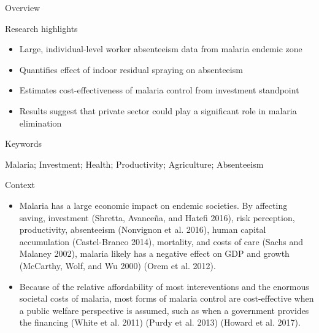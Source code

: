 \documentclass[ignorenonframetext,]{beamer}
\providecommand{\tightlist}{%
  \setlength{\itemsep}{0pt}\setlength{\parskip}{0pt}}
\begin{document}
\begin{frame}{Overview}

\begin{block}{Research highlights}

\begin{itemize}
\tightlist
\item
  Large, individual-level worker absenteeism data from malaria endemic
  zone\\
\item
  Quantifies effect of indoor residual spraying on absenteeism\\
\item
  Estimates cost-effectiveness of malaria control from investment
  standpoint\\
\item
  Results suggest that private sector could play a significant role in
  malaria elimination
\end{itemize}

\end{block}

\begin{block}{Keywords}

Malaria; Investment; Health; Productivity; Agriculture; Absenteeism

\end{block}

\end{frame}

\begin{frame}{Context}

\begin{itemize}
\tightlist
\item
  Malaria has a large economic impact on endemic societies. By affecting
  saving, investment (Shretta, Avanceña, and Hatefi 2016), risk
  perception, productivity, absenteeism (Nonvignon et al. 2016), human
  capital accumulation (Castel-Branco 2014), mortality, and costs of
  care (Sachs and Malaney 2002), malaria likely has a negative effect on
  GDP and growth (McCarthy, Wolf, and Wu 2000) (Orem et al. 2012).\\
\item
  Because of the relative affordability of most intereventions and the
  enormous societal costs of malaria, most forms of malaria control are
  cost-effective when a public welfare perspective is assumed, such as
  when a government provides the financing (White et al. 2011) (Purdy et
  al. 2013) (Howard et al. 2017).
\end{itemize}

\end{frame}
\end{document}
